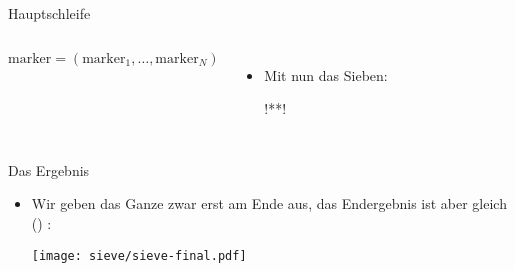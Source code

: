 \begin{frame}[c,fragile]{Hauptschleife}
    \footnotesize\begin{columns}[c,onlytextwidth]%
\begin{algorithm}[H]
    \PreCode
    \StartCode
    \(\mathrm{marker} = (\mathrm{marker}_1, \ldots, \mathrm{marker}_N)\)\;
\end{algorithm}
\begin{itemize}[<+(1)->]
    \item Mit \bxlatex{\\Sieve} nun das Sieben:
\begin{plainxlatex}[morekeywords={[5]{\\i}}]
!**!\newcommand{\Sieve}{
  !*\onslide<4->*!\SieveReset
  !*\onslide<5->*!\calc \max = sqrt(\N);
  !*\onslide<6->*!\foreach \step in {2,...,\max}{
    !*\onslide<7->*!\ifcsundef{marker@!**!\step}{
      !*\onslide<8->*!\SieveStep{\step}
    !*\onslide<7->*!}{}
  !*\onslide<9->*!} \SievePrint
!*\onslide<3->*!}
\end{plainxlatex}
\end{itemize}
\end{columns}
\end{frame}




\begin{frame}[c,fragile]{Das Ergebnis}
\begin{itemize}[<+(1)->]
    \item Wir geben das Ganze zwar erst am Ende aus, das Endergebnis ist aber gleich () \bxlatex{\\Sieve}:\pause
\begin{center}
    \texttt{[image: sieve/sieve-final.pdf]}
\end{center}
\end{itemize}
\end{frame}
\fi

